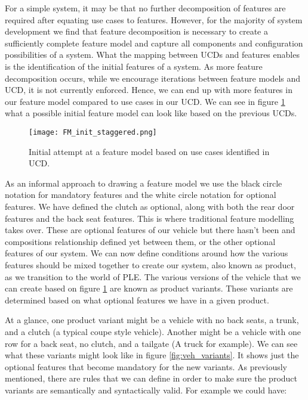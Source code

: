 For a simple system, it may be that no further decomposition of features are required after equating use cases to features. However, for the majority of system development we find that feature decomposition is necessary to create a sufficiently complete feature model and capture all components and configuration possibilities of a system. What the mapping between \ac{UCD}s and features enables is the identification of the initial features of a system. As more feature decomposition occurs, while we encourage iterations between feature models and \ac{UCD}, it is not currently enforced. Hence, we can end up with more features in our feature model compared to use cases in our \ac{UCD}. We can see in figure \ref{fig:FM_init} what a possible initial feature model can look like based on the previous \ac{UCD}s.


\begin{figure}
	\centering
	\texttt{[image: FM\_init\_staggered.png]}
	\caption{Initial attempt at a feature model based on use cases identified in \ac{UCD}.}
	\label{fig:FM_init}
\end{figure}

%	

As an informal approach to drawing a feature model we use the black circle notation for mandatory features and the white circle notation for optional features. We have defined the clutch as optional, along with both the rear door features and the back seat features. This is where traditional feature modelling takes over. These are optional features of our vehicle but there hasn't been and compositions relationship defined yet between them, or the other optional features of our system. We can now define conditions around how the various features should be mixed together to create our system, also known as product, as we transition to the world of \ac{PLE}. The various versions of the vehicle that we can create based on figure \ref{fig:FM_init} are known as product variants. These variants are determined based on what optional features we have in a given product.

At a glance, one product variant might be a vehicle with no back seats, a trunk, and a clutch (a typical coupe style vehicle). Another might be a vehicle with one row for a back seat, no clutch, and a tailgate (A truck for example). We can see what these variants might look like in figure \ref{fig:veh_variants}. It shows just the optional features that become mandatory for the new variants. As previously mentioned, there are rules that we can define in order to make sure the product variants are semantically and syntactically valid. For example we could have:

